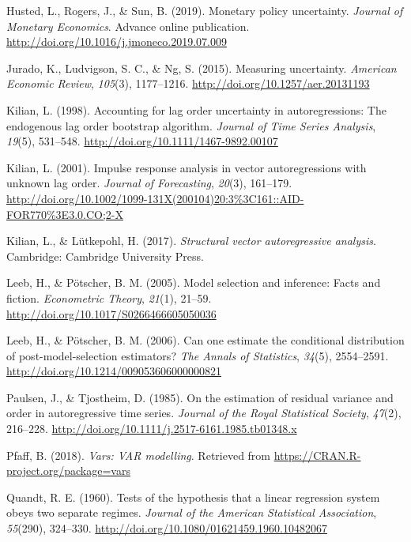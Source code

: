\documentclass[12pt,twoside]{reedthesis}
\begin{document}
\leavevmode\hypertarget{ref-hustrogesun:2019}{}%
Husted, L., Rogers, J., \& Sun, B. (2019). Monetary policy uncertainty. \emph{Journal of Monetary Economics}. Advance online publication. \url{http://doi.org/10.1016/j.jmoneco.2019.07.009}

\leavevmode\hypertarget{ref-juraludvng:2015}{}%
Jurado, K., Ludvigson, S. C., \& Ng, S. (2015). Measuring uncertainty. \emph{American Economic Review}, \emph{105}(3), 1177--1216. \url{http://doi.org/10.1257/aer.20131193}

\leavevmode\hypertarget{ref-kilian:1998}{}%
Kilian, L. (1998). Accounting for lag order uncertainty in autoregressions: The endogenous lag order bootstrap algorithm. \emph{Journal of Time Series Analysis}, \emph{19}(5), 531--548. \url{http://doi.org/10.1111/1467-9892.00107}

\leavevmode\hypertarget{ref-kilian:2001}{}%
Kilian, L. (2001). Impulse response analysis in vector autoregressions with unknown lag order. \emph{Journal of Forecasting}, \emph{20}(3), 161--179. \url{http://doi.org/10.1002/1099-131X(200104)20:3\%3C161::AID-FOR770\%3E3.0.CO;2-X}

\leavevmode\hypertarget{ref-kililutk:2017}{}%
Kilian, L., \& Lütkepohl, H. (2017). \emph{Structural vector autoregressive analysis}. Cambridge: Cambridge University Press.

\leavevmode\hypertarget{ref-leebpots:2005}{}%
Leeb, H., \& Pötscher, B. M. (2005). Model selection and inference: Facts and fiction. \emph{Econometric Theory}, \emph{21}(1), 21--59. \url{http://doi.org/10.1017/S0266466605050036}

\leavevmode\hypertarget{ref-leebpots:2006}{}%
Leeb, H., \& Pötscher, B. M. (2006). Can one estimate the conditional distribution of post-model-selection estimators? \emph{The Annals of Statistics}, \emph{34}(5), 2554--2591. \url{http://doi.org/10.1214/009053606000000821}

\leavevmode\hypertarget{ref-paultjos:1985}{}%
Paulsen, J., \& Tjostheim, D. (1985). On the estimation of residual variance and order in autoregressive time series. \emph{Journal of the Royal Statistical Society}, \emph{47}(2), 216--228. \url{http://doi.org/10.1111/j.2517-6161.1985.tb01348.x}

\leavevmode\hypertarget{ref-R-vars}{}%
Pfaff, B. (2018). \emph{Vars: VAR modelling}. Retrieved from \url{https://CRAN.R-project.org/package=vars}

\leavevmode\hypertarget{ref-quandt:1960}{}%
Quandt, R. E. (1960). Tests of the hypothesis that a linear regression system obeys two separate regimes. \emph{Journal of the American Statistical Association}, \emph{55}(290), 324--330. \url{http://doi.org/10.1080/01621459.1960.10482067}
\end{document}

